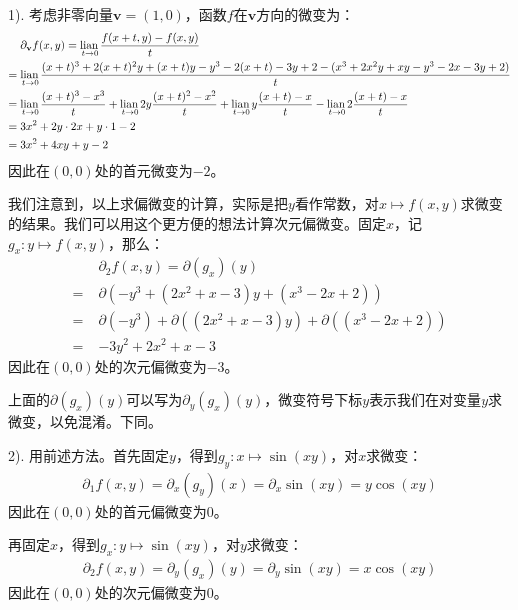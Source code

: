 \documentclass[12pt,UTF8,fontset=none]{ctexbook}
\begin{document}
\begin{so}
    \mbox{} \\
    1). 考虑非零向量$\mathbf{v} = (1,0)$，函数$f$在$\mathbf{v}$方向的微变为：
    \begin{align*}
        &\partial_{\mathbf{v}} f (x, y) = \underset{t\to 0}{\operatorname{lian}\,}\frac{f(x+t,y) - f(x,y)}{t} \\
        =\;& \underset{t\to 0}{\operatorname{lian}\,}\frac{(x+t)^3 + 2(x+t)^2y + (x+t)y - y^3 - 2(x+t) - 3y + 2 - (x^3 + 2x^2y + xy - y^3 - 2x - 3y + 2)}{t} \\
        =\;& \underset{t\to 0}{\operatorname{lian}\,}\frac{(x+t)^3 - x^3}{t} + \underset{t\to 0}{\operatorname{lian}\,} 2y\frac{(x+t)^2 - x^2}{t} + \underset{t\to 0}{\operatorname{lian}\,}y\frac{(x+t) - x}{t} - \underset{t\to 0}{\operatorname{lian}\,}2\frac{(x+t) - x}{t} \\
        =\;& 3x^2 + 2y\cdot 2x + y\cdot 1 - 2 \\
        =\;& 3x^2 + 4xy + y - 2
    \end{align*}
    因此在$(0,0)$处的首元微变为$-2$。

    我们注意到，以上求偏微变的计算，实际是把$y$看作常数，对$x\mapsto f(x,y)$求微变的结果。我们可以用这个更方便的想法计算次元偏微变。固定$x$，记$g_x: y\mapsto f(x, y)$，那么：
    \begin{align*}
        &\partial_{2} f (x, y) =\partial (g_x) (y) \\
        =\;& \partial \left(-y^3 + (2x^2 + x - 3)y + (x^3  - 2x + 2) \right) \\
        =\;& \partial \left(-y^3\right) +  \partial \left((2x^2 + x - 3)y \right) +  \partial \left((x^3  - 2x + 2) \right) \\
        =\;& -3y^2 + 2x^2 + x - 3
    \end{align*}
    因此在$(0,0)$处的次元偏微变为$-3$。

    上面的$\partial (g_x) (y)$可以写为$\partial_y (g_x) (y)$，微变符号下标$y$表示我们在对变量$y$求微变，以免混淆。下同。

    2). 用前述方法。首先固定$y$，得到$g_y: x\mapsto \sin{(xy)} $，对$x$求微变：
    \begin{align*}
        \partial_{1} f (x, y) = \partial_x (g_y) (x) = \partial_x \sin{(xy)} = y\cos{(xy)}
    \end{align*}
    因此在$(0,0)$处的首元偏微变为$0$。

    再固定$x$，得到$g_x: y\mapsto \sin{(xy)} $，对$y$求微变：
    \begin{align*}
        \partial_{2} f (x, y) = \partial_y (g_x) (y) = \partial_y \sin{(xy)} = x\cos{(xy)}
    \end{align*}
    因此在$(0,0)$处的次元偏微变为$0$。


\end{so}
\end{document}
